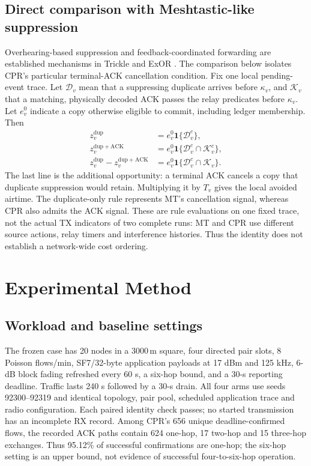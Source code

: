 \documentclass[conference,letterpaper,10pt]{IEEEtran}
\begin{document}
\subsection{Direct comparison with Meshtastic-like suppression}
Overhearing-based suppression and feedback-coordinated forwarding are
established mechanisms in Trickle and ExOR
\cite{levis2004trickle,biswas2005exor}. The comparison below isolates
CPR's particular terminal-ACK cancellation condition.
Fix one local pending-event trace.
Let $\mathcal D_v$ mean that a suppressing duplicate arrives before
$\kappa_v$, and $\mathcal K_v$ that a matching, physically decoded ACK
passes the relay predicates before $\kappa_v$. Let $e_v^0$ indicate a copy
otherwise eligible to commit, including ledger membership. Then
\begin{equation}
\begin{aligned}
z_v^{\mathrm{dup}}&=e_v^0\mathbf 1\{\mathcal D_v^c\},\\
z_v^{\mathrm{dup+ACK}}
 &=e_v^0\mathbf 1\{\mathcal D_v^c\cap\mathcal K_v^c\},\\
z_v^{\mathrm{dup}}-z_v^{\mathrm{dup+ACK}}
 &=e_v^0\mathbf 1\{\mathcal D_v^c\cap\mathcal K_v\}.
\end{aligned}
\label{eq:cancel-signal-contrast}
\end{equation}
The last line is the additional opportunity: a terminal ACK cancels a copy
that duplicate suppression would retain. Multiplying it by $T_v$ gives the
local avoided airtime. The duplicate-only rule represents MT's cancellation
signal, whereas CPR also admits the ACK signal. These are rule evaluations
on one fixed trace, not the actual TX indicators of two complete runs:
MT and CPR use different source actions, relay timers and interference
histories. Thus the identity does not establish a network-wide cost ordering.

\section{Experimental Method}
\subsection{Workload and baseline settings}
The frozen case has 20 nodes in a $3000\,\mathrm{m}$ square, four directed
pair slots, 8 Poisson flows/min, SF7/32-byte application payloads at 17 dBm
and 125 kHz, 6-dB block fading refreshed every 60 s, a six-hop bound,
and a 30-s reporting deadline. Traffic lasts 240 s followed by a 30-s drain.
All four arms use seeds 92300--92319 and identical topology, pair pool,
scheduled application trace and radio configuration. Each paired identity
check passes; no started transmission has an incomplete RX record.
Among CPR's 656 unique deadline-confirmed flows, the recorded ACK paths
contain 624 one-hop, 17 two-hop and 15 three-hop exchanges.
Thus 95.12\% of successful confirmations are one-hop; the six-hop setting
is an upper bound, not evidence of successful four-to-six-hop operation.
\end{document}
